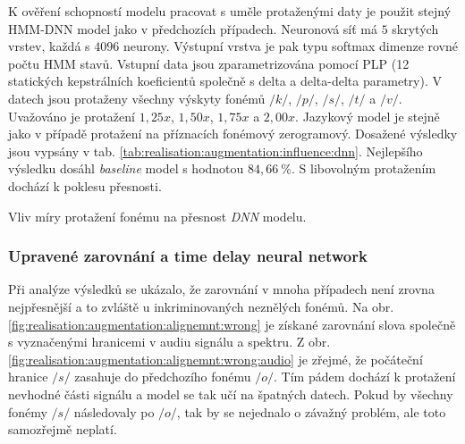 K ověření schopností modelu pracovat s uměle protaženými daty je použit stejný HMM-DNN model jako v předchozích případech. Neuronová síť má $5$ skrytých vrstev, každá s $4096$ neurony. Výstupní vrstva je pak typu softmax dimenze rovné počtu HMM stavů. Vstupní data jsou zparametrizována pomocí PLP (12 statických kepstrálních koeficientů společně s delta a delta-delta parametry). V datech jsou protaženy všechny výskyty fonémů $/k/$, $/p/$, $/s/$, $/t/$ a $/v/$. Uvažováno je protažení $1,25x$, $1,50x$, $1,75x$ a $2,00x$. Jazykový model je stejně jako v případě protažení na příznacích fonémový zerogramový. Dosažené výsledky jsou vypsány v tab. \ref{tab:realisation:augmentation:influence:dnn}. Nejlepšího výsledku dosáhl \textit{baseline} model s hodnotou $84,66\ \%$. S libovolným protažením dochází k poklesu přesnosti.

\begin{table}[htpb]
  \centering
  \def\arraystretch{1.5}
  \caption{Vliv míry protažení fonému na přesnost \textit{DNN} modelu.}
  \label{tab:realisation:augmentation:influence:dnn}
\end{table}

\subsubsection{Upravené zarovnání a time delay neural network}

Při analýze výsledků se ukázalo, že zarovnání v mnoha případech není zrovna nejpřesnější a to zvláště u inkriminovaných neznělých fonémů. Na obr. \ref{fig:realisation:augmentation:alignemnt:wrong} je získané zarovnání slova  společně s vyznačenými hranicemi v audiu signálu a spektru. Z obr. \ref{fig:realisation:augmentation:alignemnt:wrong:audio} je zřejmé, že počáteční hranice $/s/$ zasahuje do předchozího fonému $/o/$. Tím pádem dochází k protažení nevhodné části signálu a model se tak učí na špatných datech. Pokud by všechny fonémy $/s/$ následovaly po $/o/$, tak by se nejednalo o závažný problém, ale toto samozřejmě neplatí.

